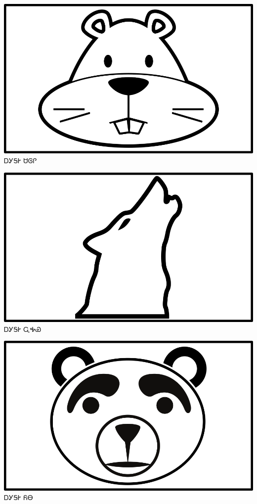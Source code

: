 \documentclass[avery5371]{flashcards}%
\begin{document}
    \begin{flashcard}{
        \includegraphics[width=0.95\columnwidth,height=.51\columnwidth,keepaspectratio]{../artwork/objects-animate/saloli}
    }
        \Huge ᎠᎩᎦᎨ ᏌᎶᎵ
    \end{flashcard}

    \begin{flashcard}{
        \includegraphics[width=0.95\columnwidth,height=.51\columnwidth,keepaspectratio]{../artwork/objects-animate/wahya}
    }
        \Huge ᎠᎩᎦᎨ ᏩᎭᏯ
    \end{flashcard}

    \begin{flashcard}{
        \includegraphics[width=0.95\columnwidth,height=.51\columnwidth,keepaspectratio]{../artwork/objects-animate/yona}
    }
        \Huge ᎠᎩᎦᎨ ᏲᎾ
    \end{flashcard}
\end{document}
